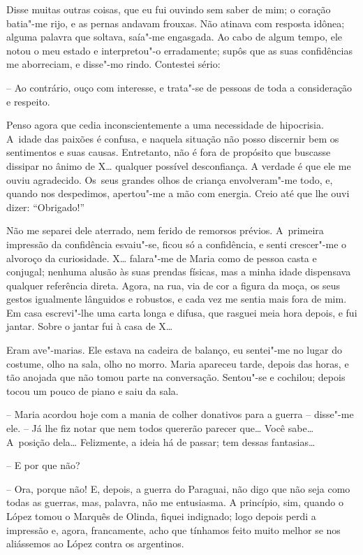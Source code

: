 Disse muitas outras coisas, que eu fui ouvindo sem saber de mim; o
coração batia"-me rijo, e as pernas andavam frouxas. Não atinava com
resposta idônea; alguma palavra que soltava, saía"-me engasgada. Ao cabo
de algum tempo, ele notou o meu estado e interpretou"-o erradamente;
supôs que as suas confidências me aborreciam, e disse"-mo rindo.
Contestei sério:

-- Ao contrário, ouço com interesse, e trata"-se de pessoas de toda a
consideração e respeito.

Penso agora que cedia inconscientemente a uma necessidade de hipocrisia.
A~idade das paixões é confusa, e naquela situação não posso discernir
bem os sentimentos e suas causas. Entretanto, não é fora de propósito
que buscasse dissipar no ânimo de X\ldots{} qualquer possível desconfiança. A
verdade é que ele me ouviu agradecido. Os~seus grandes olhos de criança
envolveram"-me todo, e, quando nos despedimos, apertou"-me a mão com
energia. Creio até que lhe ouvi dizer: ``Obrigado!''

Não me separei dele aterrado, nem ferido de remorsos prévios. A~primeira
impressão da confidência esvaiu"-se, ficou só a confidência, e senti
crescer"-me o alvoroço da curiosidade. X\ldots{} falara"-me de Maria como de
pessoa casta e conjugal; nenhuma alusão às suas prendas físicas, mas a
minha idade dispensava qualquer referência direta. Agora, na rua, via de
cor a figura da moça, os seus gestos igualmente lânguidos e robustos, e
cada vez me sentia mais fora de mim. Em casa escrevi"-lhe uma carta longa
e difusa, que rasguei meia hora depois, e fui jantar. Sobre o jantar fui
à casa de X\ldots{}

Eram ave"-marias. Ele estava na cadeira de balanço, eu sentei"-me no lugar
do costume, olho na sala, olho no morro. Maria apareceu tarde, depois
das horas, e tão anojada que não tomou parte na conversação. Sentou"-se e
cochilou; depois tocou um pouco de piano e saiu da sala.

-- Maria acordou hoje com a mania de colher donativos para a guerra --
disse"-me ele. -- Já lhe fiz notar que nem todos quererão parecer que\ldots{}
Você sabe\ldots{} A~posição dela\ldots{} Felizmente, a ideia há de passar; tem
dessas fantasias\ldots{}

-- E por que não?

-- Ora, porque não! E, depois, a guerra do Paraguai, não digo que não
seja como todas as guerras, mas, palavra, não me entusiasma. A
princípio, sim, quando o López tomou o Marquês de Olinda, fiquei
indignado; logo depois perdi a impressão e, agora, francamente, acho que
tínhamos feito muito melhor se nos aliássemos ao López contra os
argentinos.

